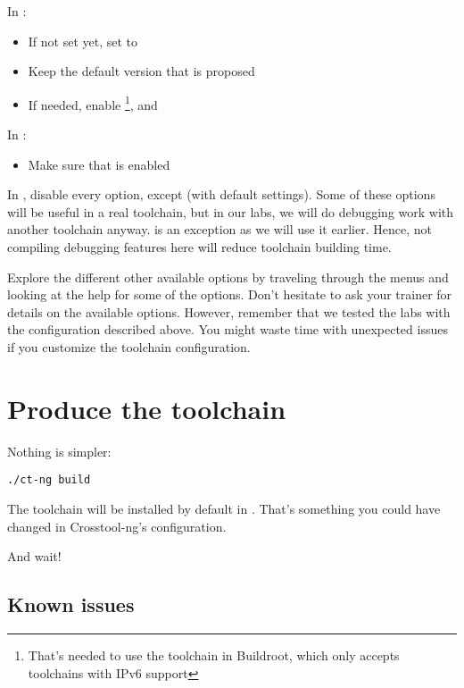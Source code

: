 In :
\begin{itemize}
  \item If not set yet, set  to 
  \item Keep the default version that is proposed
  \item If needed, enable \footnote{
        That's needed to use the toolchain in Buildroot, which only
        accepts toolchains with IPv6 support},
         and
\end{itemize}

In :
\begin{itemize}
  \item Make sure that  is enabled
\end{itemize}

In , disable every option, except 
(with default settings). Some of these options will be useful in a real
toolchain, but in our labs, we will do debugging work with another
toolchain anyway.  is an exception as we will use it earlier.
Hence, not compiling debugging features here will reduce toolchain building time.

Explore the different other available options by traveling through the
menus and looking at the help for some of the options. Don't hesitate
to ask your trainer for details on the available options. However,
remember that we tested the labs with the configuration described
above. You might waste time with unexpected issues if you customize the
toolchain configuration.

\section{Produce the toolchain}

Nothing is simpler:

\begin{verbatim}
./ct-ng build
\end{verbatim}

The toolchain will be installed by default in .
That's something you could have changed in Crosstool-ng's configuration.

And wait!

\subsection{Known issues}


